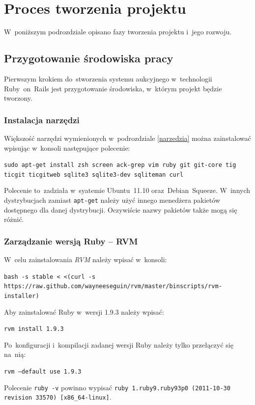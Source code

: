 \section{Proces tworzenia projektu}

W~poniższym podrozdziale opisano fazy tworzenia projektu i~jego rozwoju.

\subsection{Przygotowanie środowiska pracy}

Pierwszym krokiem do~stworzenia systemu aukcyjnego w~technologii Ruby~on~Rails jest przygotowanie środowiska, w~którym projekt będzie tworzony.

\subsubsection{Instalacja narzędzi}

Większość narzędzi wymienionych w~podrozdziale \ref{narzedzia} można zainstalować wpisując w~konsoli następujące polecenie:


\texttt{sudo apt-get install zsh screen ack-grep vim ruby git git-core tig ticgit ticgitweb sqlite3 sqlite3-dev sqliteman curl}


Polecenie to~zadziała w~syatemie Ubuntu~11.10 oraz~Debian~Squeeze. W~innych dystrybucjach zamiast \texttt{apt-get} należy użyć innego menedżera pakietów dostępnego dla danej dystrybucji. Oczywiście nazwy pakietów także mogą się różnić.

\subsubsection{Zarządzanie wersją Ruby -- RVM}

W~celu zainstalowania \textit{RVM} należy wpisać w~konsoli:


\verb+bash -s stable < <(curl -s https://raw.github.com/wayneeseguin/rvm/master/binscripts/rvm-installer)+


Aby zainstalować Ruby w~wersji 1.9.3 należy wpisać:


\verb+rvm install 1.9.3+


Po~konfiguracji i~kompilacji zadanej wersji Ruby należy tylko przełączyć się na~nią:


\texttt{rvm --default use 1.9.3}


Polecenie \texttt{ruby -v} powinno wypisać \texttt{ruby 1.ruby9.ruby93p0 (2011-10-30 revision 33570) [x86\_64-linux]}.

